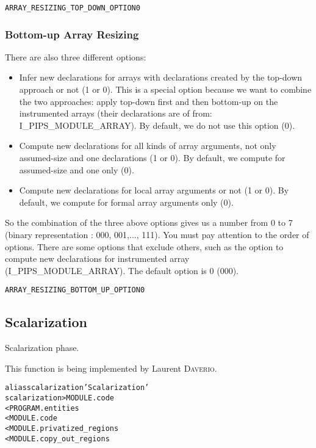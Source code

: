 \documentclass[a4paper]{report}
\newenvironment{PipsProp}{\begin{alltt}}{\end{alltt}}
\newenvironment{PipsMake}{\begin{alltt}}{\end{alltt}}
\begin{document}
\begin{PipsProp}
ARRAY_RESIZING_TOP_DOWN_OPTION 0
\end{PipsProp}

\subsubsection*{Bottom-up Array Resizing}

There are also three different options:
\begin{itemize}
\item Infer new declarations for arrays with declarations created by the
  top-down approach or not (1 or 0). This is a special option because we
  want to combine the two approaches: apply top-down first and then
  bottom-up on the instrumented arrays (their declarations are of from:
  I\_PIPS\_MODULE\_ARRAY). By default, we do not use this option (0). 
\item Compute new declarations for all kinds of array arguments,
  not only assumed-size and one declarations (1 or 0). By default, we
  compute for assumed-size and one only (0).
\item Compute new declarations for local array arguments or not (1 or 0). By default, we
  compute for formal array arguments only (0).
\end{itemize}
So the combination of the three above options gives us a number from 0 to
7 (binary representation : 000, 001,..., 111). You must pay attention to
the order of options. There are some options that exclude others, such as
the option to compute new declarations for instrumented array
(I\_PIPS\_MODULE\_ARRAY). The default option is 0
(000).

\begin{PipsProp}
ARRAY_RESIZING_BOTTOM_UP_OPTION 0
\end{PipsProp}

\subsection{Scalarization}

Scalarization phase.

This function is being implemented by Laurent \textsc{Daverio}.

\begin{PipsMake}
alias scalarization 'Scalarization'
scalarization  > MODULE.code
        < PROGRAM.entities
        < MODULE.code
        < MODULE.privatized_regions
        < MODULE.copy_out_regions
\end{PipsMake}
\end{document}
